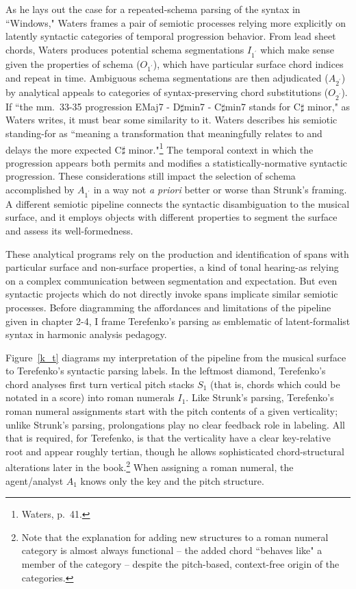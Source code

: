 As he lays out the case for a repeated-schema parsing of the syntax in ``Windows," Waters frames a pair of semiotic processes relying more explicitly on latently syntactic categories of temporal progression behavior.  From lead sheet chords, Waters produces potential schema segmentations $I_{1^{\prime}}$ which make sense given the properties of schema ($O_{1^{\prime}}$), which have particular surface chord indices and repeat in time.  Ambiguous schema segmentations are then adjudicated ($A_{2^{\prime}}$) by analytical appeals to categories of syntax-preserving chord substitutions ($O_{2^{\prime}}$).  If ``the mm.\ 33-35 progression EMaj7 - D$\sharp$min7 - C$\sharp$min7 stands for C$\sharp$ minor," as Waters writes, it must bear some similarity to it. Waters describes his semiotic standing-for as ``meaning a transformation that meaningfully relates to and delays the more expected C$\sharp$ minor."\footnote{Waters, p.\ 41.}  The temporal context in which the progression appears both permits and modifies a statistically-normative syntactic progression.  These considerations still impact the selection of schema accomplished by $A_{1^{\prime}}$ in a way not \emph{a priori} better or worse than Strunk's framing.  A different semiotic pipeline connects the syntactic disambiguation to the musical surface, and it employs objects with different properties to segment the surface and assess its well-formedness.

These analytical programs rely on the production and identification of spans with particular surface and non-surface properties, a kind of tonal hearing-as relying on a complex communication between segmentation and expectation.  But even syntactic projects which do not directly invoke spans implicate similar semiotic processes.  Before diagramming the affordances and limitations of the pipeline given in chapter 2-4, I frame Terefenko's parsing as emblematic of latent-formalist syntax in harmonic analysis pedagogy.

Figure~\ref{k_t} diagrams my interpretation of the pipeline from the musical surface to Terefenko's syntactic parsing labels.  In the leftmost diamond, Terefenko's chord analyses first turn vertical pitch stacks $S_1$ (that is, chords which could be notated in a score) into roman numerals $I_1$.  Like Strunk's parsing, Terefenko's roman numeral assignments start with the pitch contents of a given verticality; unlike Strunk's parsing, prolongations play no clear feedback role in labeling.  All that is required, for Terefenko, is that the verticality have a clear key-relative root and appear roughly tertian, though he allows sophisticated chord-structural alterations later in the book.\footnote{Note that the explanation for adding new structures to a roman numeral category is almost always functional -- the added chord ``behaves like" a member of the category -- despite the pitch-based, context-free origin of the categories.}  When assigning a roman numeral, the agent/analyst $A_1$ knows only the key and the pitch structure.

